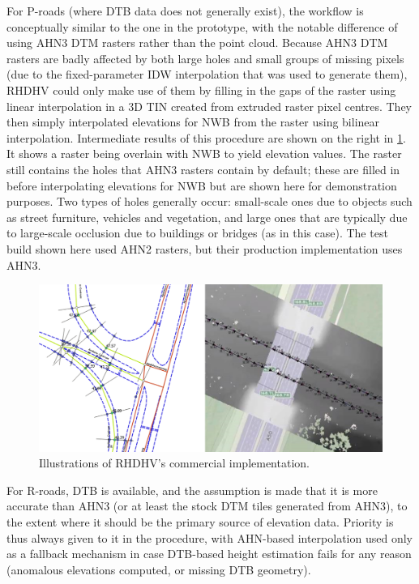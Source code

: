 For P-roads (where DTB data does not generally exist), the workflow is conceptually similar to the one in the prototype, with the notable difference of using AHN3 DTM rasters rather than the point cloud. Because AHN3 DTM rasters are badly affected by both large holes and small groups of missing pixels (due to the fixed-parameter IDW interpolation that was used to generate them), RHDHV could only make use of them by filling in the gaps of the raster using linear interpolation in a 3D TIN created from extruded raster pixel centres. They then simply interpolated elevations for NWB from the raster using bilinear interpolation. Intermediate results of this procedure are shown on the right in \ref{fig:rhdhv}. It shows a raster being overlain with NWB to yield elevation values. The raster still contains the holes that AHN3 rasters contain by default; these are filled in before interpolating elevations for NWB but are shown here for demonstration purposes. Two types of holes generally occur: small-scale ones due to objects such as street furniture, vehicles and vegetation, and large ones that are typically due to large-scale occlusion due to buildings or bridges (as in this case). The test build shown here used AHN2 rasters, but their production implementation uses AHN3.

\begin{figure}[h]
    \centering
    \includegraphics[width=\linewidth]{final_report/figs/rhdhv_combined.png}
    \caption{Illustrations of RHDHV's commercial implementation.}
    \label{fig:rhdhv}
\end{figure}

For R-roads, DTB is available, and the assumption is made that it is more accurate than AHN3 (or at least the stock DTM tiles generated from AHN3), to the extent where it should be the primary source of elevation data. Priority is thus always given to it in the procedure, with AHN-based interpolation used only as a fallback mechanism in case DTB-based height estimation fails for any reason (anomalous elevations computed, or missing DTB geometry).

